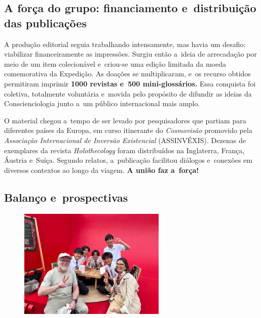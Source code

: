 \documentclass{gescons}
\begin{document}
\subsection*{A força do grupo: financiamento e~distribuição das publicações}


A produção editorial seguia trabalhando intensamente, mas havia um desafio: viabilizar financeiramente as impressões. Surgiu então a~ideia de arrecadação por meio de um item colecionável e~criou-se uma edição limitada da moeda comemorativa da Expedição. As doações se multiplicaram, e~os recurso obtidos permitiram imprimir \textbf{1000 revistas e~500 mini-glossários.} Essa conquista foi coletiva, totalmente voluntária e~movida pelo propósito de difundir as ideias da Conscienciologia junto a~um público internacional mais amplo.

O material chegou a~tempo de ser levado por pesquisadores que partiam para diferentes países da Europa, em curso itinerante do \emph{Cosmovisão} promovido pela \emph{Associação Internacional de Inversão Existencial} (ASSINVÉXIS). Dezenas de exemplares da revista \emph{Holothecology} foram distribuídos na Inglaterra, França, Áustria e~Suíça. Segundo relatos, a~publicação facilitou diálogos e~conexões em diversos contextos ao longo da viagem. \textbf{A união faz a~força!}



\subsection*{Balanço e~prospectivas}

\begin{figure}
  \vspace{-15mm}\hspace{-1mm}\includegraphics[width=7cm,trim={130 100 105 120},clip]{articles/resumo/fotos/materia3/japao.jpeg}
\end{figure}
\end{document}
